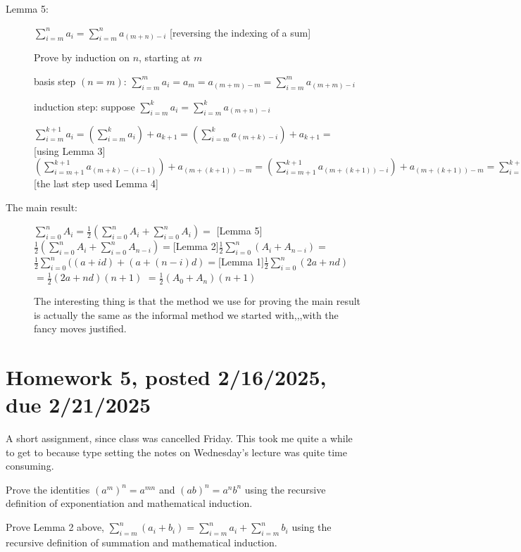 \documentclass[12pt]{article}
\begin{document}
\begin{description}
\item[Lemma 5:] $\sum_{i=m}^n a_i = \sum_{i=m}^n a_{(m+n)-i}$  [reversing the indexing of a sum]

Prove by induction on $n$, starting at $m$

basis step $(n=m)$:  $\sum_{i=m}^m a_i = a_m = a_{(m+m)-m} = \sum_{i=m}^m a_{(m+m)-i}$

induction step:  suppose $\sum_{i=m}^k a_i = \sum_{i=m}^k a_{(m+n)-i}$

$\sum_{i=m}^{k+1} a_i =(\sum_{i=m}^k a_i )+ a_{k+1} = (\sum_{i=m}^ka_{(m+k)-i}) + a_{k+1} =$ [using Lemma 3] $(\sum_{i=m+1}^{k+1}a_{(m+k)-(i-1)}) + a_{(m+(k+1))-m} = (\sum_{i=m+1}^{k+1}a_{(m+(k+1))-i}) + a_{(m+(k+1))-m} = \sum_{i=m}^{k+1}a_{(m+(k+1))-i}$ [the last step used Lemma 4]

\item[The main result:]  $\sum_{i=0}^n A_i = \frac12(\sum_{i=0}^n A_i + \sum_{i=0}^n A_i) = $ [Lemma 5]\newline$\frac12(\sum_{i=0}^n A_i + \sum_{i=0}^n A_{n-i}) = $[Lemma 2]$ \frac 12\sum_{i=0}^n(A_i+A_{n-i}) =$\newline$ \frac12\sum_{i=0}^n((a+id) + (a+(n-i)d) = $[Lemma 1]$\frac12 \sum_{i=0}^n(2a+nd) $\newline$= \frac12(2a+nd)(n+1) $ $= \frac12(A_0 + A_n)(n+1)$

The interesting thing is that the method we use for proving the main result is actually the same as the informal method we started with,,,with the fancy moves justified.



\end{description}

\section{Homework 5, posted 2/16/2025, due 2/21/2025}

A short assignment, since class was cancelled Friday.  This took me quite a while to get to because type setting the notes on Wednesday's lecture was quite time consuming.

Prove the identities $(a^m)^n=a^{mn}$ and $(ab)^n = a^nb^n$ using the recursive definition of exponentiation and mathematical induction.

Prove Lemma 2 above, $\sum_{i=m}^n (a_i + b_i) = \sum_{i=m}^n a_i + \sum_{i=m}^n b_i$ using the recursive definition of summation and mathematical induction.
\end{document}
